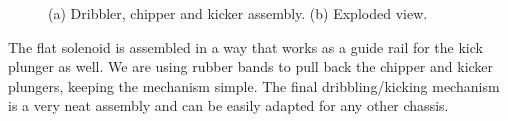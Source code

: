 \begin{figure}[!htb]
	\centering
	\caption{(a) Dribbler, chipper and kicker assembly. (b) Exploded view.}
	\label{mec4}
\end{figure}

The flat solenoid is assembled in a way that works as a guide rail for the kick plunger as well. We are using rubber bands to pull back the chipper and kicker plungers, keeping the mechanism simple. The final dribbling/kicking mechanism is a very neat assembly and can be easily adapted for any other chassis.
